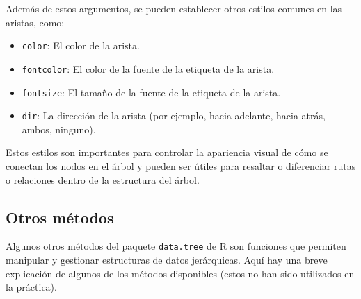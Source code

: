\documentclass[12pt]{report}\usepackage[]{graphicx}\usepackage[dvipsnames]{xcolor}
\begin{document}
			 	\noindent Además de estos argumentos, se pueden establecer otros estilos comunes en las aristas, como:
			 	
			 	\begin{itemize}
			 		\item \texttt{color}: El color de la arista.
			 		\item \texttt{fontcolor}: El color de la fuente de la etiqueta de la arista.
			 		\item \texttt{fontsize}: El tamaño de la fuente de la etiqueta de la arista.
			 		\item \texttt{dir}: La dirección de la arista (por ejemplo, hacia adelante, hacia atrás, ambos, ninguno).
			 	\end{itemize}
			 	
			 	Estos estilos son importantes para controlar la apariencia visual de cómo se conectan los nodos en el árbol y pueden ser útiles para resaltar o diferenciar rutas o relaciones dentro de la estructura del árbol.
			 	
		 	\subsection{Otros métodos}\label{subsec:otros_style}
			 	
			 	Algunos otros métodos del paquete \texttt{data.tree} de R son funciones que permiten manipular y gestionar estructuras de datos jerárquicas. Aquí hay una breve explicación de algunos de los métodos disponibles (estos no han sido utilizados en la práctica).
			 	
\end{document}
